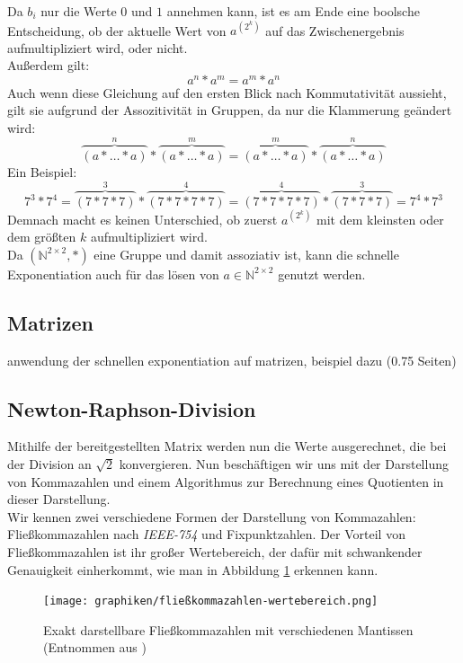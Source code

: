 \documentclass[course=erap]{aspdoc}
\begin{document}
Da $b_i$ nur die Werte $0$ und $1$ annehmen kann, ist es am Ende eine boolsche Entscheidung, ob der aktuelle Wert von $a^{(2^k)}$ auf das Zwischenergebnis aufmultipliziert wird, oder nicht.\\
Außerdem gilt:
\begin{equation}\label{swap_exponents}
      a^n*a^m = a^m*a^n
\end{equation}
Auch wenn diese Gleichung auf den ersten Blick nach Kommutativität aussieht, gilt sie aufgrund der Assozitivität in Gruppen, da nur die Klammerung geändert wird:
\[ \overbrace{(a*\dots*a)}^n*\overbrace{(a*\dots*a)}^m = \overbrace{(a*\dots*a)}^m*\overbrace{(a*\dots*a)}^n \]
Ein Beispiel:
\[ 7^3*7^4 = \overbrace{(7*7*7)}^3*\overbrace{(7*7*7*7)}^4 = \overbrace{(7*7*7*7)}^4*\overbrace{(7*7*7)}^3 = 7^4*7^3 \]
Demnach macht es keinen Unterschied, ob zuerst $a^{(2^k)}$ mit dem kleinsten oder dem größten $k$ aufmultipliziert wird.\\
Da $(\mathbb{N}^{2\times 2}, *)$ eine Gruppe und damit assoziativ ist, kann die schnelle Exponentiation auch für das lösen von $a\in\mathbb{N}^{2\times 2}$ genutzt werden.

\subsection{Matrizen} \label{sec:matrizen}
anwendung der schnellen exponentiation auf matrizen, beispiel dazu
(0.75 Seiten)

\newpage
\subsection{Newton-Raphson-Division} \label{sec:newton-raphson}
Mithilfe der bereitgestellten Matrix werden nun die Werte ausgerechnet, die bei der Division an $\sqrt{2}$ konvergieren.
Nun beschäftigen wir uns mit der Darstellung von Kommazahlen und einem Algorithmus zur Berechnung eines Quotienten in dieser Darstellung. \\
Wir kennen zwei verschiedene Formen der Darstellung von Kommazahlen: Fließkommazahlen nach \textit{IEEE-754} und Fixpunktzahlen.
Der Vorteil von Fließkommazahlen ist ihr großer Wertebereich, der dafür mit schwankender Genauigkeit einherkommt, wie man in Abbildung \ref{img:fließkommazahlen-wertebereich} erkennen kann.

\begin{figure}[h] \centering
  \texttt{[image: graphiken/fließkommazahlen-wertebereich.png]} 
  \caption{Exakt darstellbare Fließkommazahlen mit verschiedenen Mantissen (Entnommen aus \cite{fliesskommazahlen})} \label{img:fließkommazahlen-wertebereich}
\end{figure} 
\end{document}
